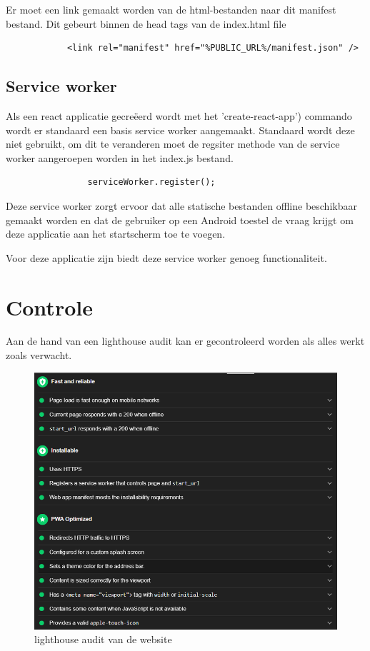 		Er moet een link gemaakt worden van de html-bestanden naar dit manifest bestand. Dit gebeurt binnen de head tags van de index.html file
		
		\begin{lstlisting}
			<link rel="manifest" href="%PUBLIC_URL%/manifest.json" />
		\end{lstlisting}
		
		
	\subsection{Service worker}
		
		Als een react applicatie gecreëerd wordt met het 'create-react-app') commando wordt er standaard een basis service worker aangemaakt. Standaard wordt deze niet gebruikt, om dit te veranderen moet de regsiter methode van de service worker aangeroepen worden in het index.js bestand.
		
		\begin{lstlisting}
				serviceWorker.register();
		\end{lstlisting}
		
		Deze service worker zorgt ervoor dat alle statische bestanden offline beschikbaar gemaakt worden en dat de gebruiker op een Android toestel de vraag krijgt om deze applicatie aan het startscherm toe te voegen.
		
		Voor deze applicatie zijn biedt deze service worker genoeg functionaliteit.
		

\section{Controle}

	Aan de hand van een lighthouse audit kan er gecontroleerd worden als alles werkt zoals verwacht.
	
	\begin{figure}[H]
		\centering
		\includegraphics{./img/lighthouse_dart.png}{}
		\caption{lighthouse audit van de website}
	\end{figure}

